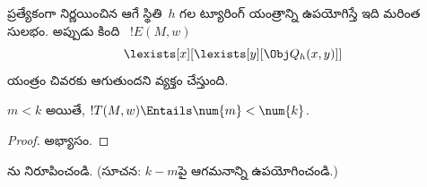 \documentclass[../../../include/open-logic-section]{subfiles}
\begin{document}
ప్రత్యేకంగా నిర్ణయించిన ఆగే స్థితి~$h$ గల ట్యూరింగ్ యంత్రాన్ని ఉపయోగిస్తే
ఇది మరింత సులభం. అప్పుడు కింది ~$!E(M, w)$
\[
\lexists[x][\lexists[y][\Obj Q_h(x, y)]]
\]
యంత్రం చివరకు ఆగుతుందని వ్యక్తం చేస్తుంది.

\begin{prop}
$m < k$ అయితే, $!T(M, w) \Entails \num{m} < \num{k}$.
\end{prop}

\begin{proof}
అభ్యాసం.
\end{proof}

\begin{prob}
ను నిరూపించండి.
(సూచన: $k-m$పై ఆగమనాన్ని ఉపయోగించండి.)
\end{prob}
\end{document}
